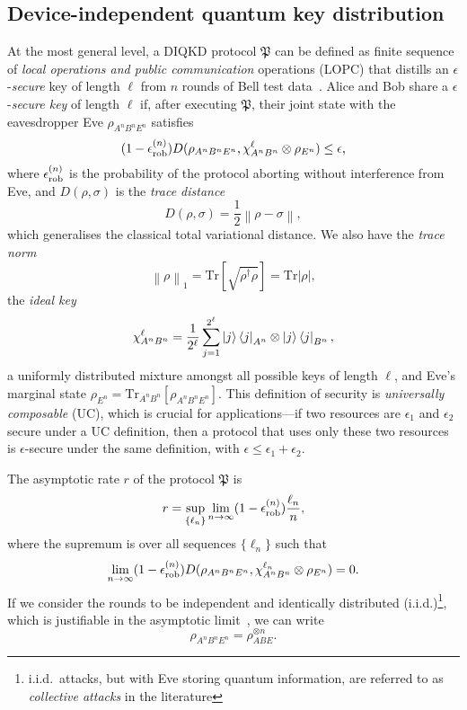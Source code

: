 \documentclass[10pt, a4paper]{article}
\newcommand{\norm}[1]{\left\lVert#1\right\rVert}
\newcommand{\abs}[1]{\left\lvert#1\right\rvert}
\newcommand{\?}{\mathrel{?}} %
\newcommand{\Tr}{\mathrm{Tr}} %
\numberwithin{equation}{section} %
\theoremstyle{definition}
\theoremstyle{plain}
\theoremstyle{plain}
\newcommand{\rob}{\rm rob}
\newcommand{\erob}[1]{\epsilon_{\rob}^{(#1)}}
\begin{document}
  \subsection{Device-independent quantum key distribution}

  At the most general level, a DIQKD protocol \(\mathfrak{P}\) can be defined as finite sequence of \emph{local operations and public communication} operations (LOPC) that distills an \(\epsilon\)-\emph{secure} key of length \(\ell\) from \(n\) rounds of Bell test data~\cite{DIQKD_Limits}. Alice and Bob share a \(\epsilon\)-\emph{secure key} of length \(\ell\) if, after executing \(\mathfrak{P}\), their joint state with the eavesdropper Eve \(\rho_{A^n B^n E^n}\) satisfies~\cite{SecurityQKD}
  \begin{equation}
    (1-\erob{n})D(\rho_{A^n B^n E^n}, \chi_{A^n B^n}^{\ell}\otimes\rho_{E^n}) \leq \epsilon,
  \end{equation}
  where \(\erob{n}\) is the probability of the protocol aborting without interference from Eve, and \(D(\rho,\sigma)\) is the \emph{trace distance}
  \begin{equation}
    D(\rho, \sigma) = \frac{1}{2}\norm{\rho - \sigma},
  \end{equation}
  which generalises the classical total variational distance. We also have the \emph{trace norm}
  \begin{equation}
    \norm{\rho}_1 = \Tr\left[ \sqrt{\rho^{\dagger}\rho} \right] = \Tr\abs{\rho},
  \end{equation}
  the \emph{ideal key}
  \begin{equation}
    \chi_{A^n B^n}^{\ell} = \frac{1}{2^{\ell}} \sum_{j=1}^{2^{\ell}} \ket{j}\bra{j}_{A^n} \otimes \ket{j}\bra{j}_{B^n},
  \end{equation}
  a uniformly distributed mixture amongst all possible keys of length \(\ell\), and Eve's marginal state \(\rho_{E^n} = \Tr_{A^n B^n}\left[ \rho_{A^n B^n E^n} \right]\). This definition of security is \emph{universally composable} (UC), which is crucial for applications---if two resources are \(\epsilon_1\) and \(\epsilon_2\) secure under a UC definition, then a protocol that uses only these two resources is \(\epsilon\)-secure under the same definition, with \(\epsilon \leq \epsilon_1 + \epsilon_2\).

  The asymptotic rate \(r\) of the protocol \(\mathfrak{P}\) is~\cite{CQKeyDistill}
  \begin{equation}
    r = \sup_{\{\ell_n\}} \lim_{n\to\infty} (1-\erob{n}) \frac{\ell_n}{n},
  \end{equation}
  where the supremum is over all sequences \(\{\ell_n\}\) such that
  \[ \lim_{n\to\infty} (1-\erob{n})D(\rho_{A^n B^n E^n}, \chi_{A^n B^n}^{\ell_n}\otimes\rho_{E^n}) = 0. \]
  If we consider the rounds to be independent and identically distributed (i.i.d.)\footnote{i.i.d.\ attacks, but with Eve storing quantum information, are referred to as \emph{collective attacks} in the literature}, which is justifiable in the asymptotic limit~\cite{DI_Proofs}, we can write
  \[ \rho_{A^n B^n E^n} = \rho_{ABE}^{\otimes n}. \]
\end{document}
